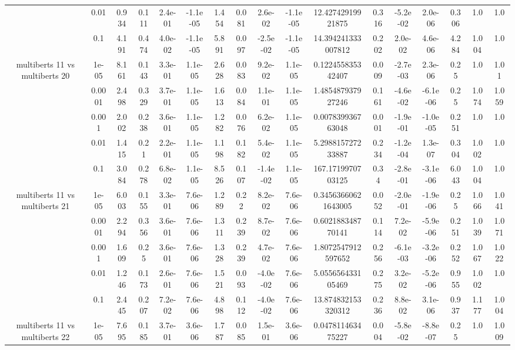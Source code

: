 \begin{tabular}{|c|c|c|c|c|c|c|c|c|c|c|c|c|c|c|c|c|}
 & 0.01 & 0.934 & 0.111 & 2.4e-01 & -1.1e-05 & 1.454 & 0.081 & 2.6e-02 & -1.1e-05 & 12.42742919921875 & 0.316 & -5.2e-02 & 2.0e-06 & 0.306 & 1.0 & 1.0 \\
 & 0.1 & 4.191 & 0.474 & 4.0e-02 & -1.1e-05 & 5.891 & 0.097 & -2.5e-02 & -1.1e-05 & 14.394241333007812 & 0.202 & 2.0e-02 & 4.6e-06 & 4.284 & 1.004 & 1.0 \\
\hline
\multirow{5}{*}{multiberts 11 vs multiberts 20} & 1e-05 & 8.161 & 0.143 & 3.3e-01 & 1.1e-05 & 2.628 & 0.083 & 9.2e-02 & 1.1e-05 & 0.122455835342407 & 0.009 & -2.7e-03 & 2.3e-06 & 0.25 & 1.0 & 1.01 \\
 & 0.0001 & 2.498 & 0.329 & 3.7e-01 & 1.1e-05 & 1.613 & 0.084 & 1.1e-01 & 1.1e-05 & 1.485487937927246 & 0.161 & -4.6e-02 & -6.1e-06 & 0.25 & 1.074 & 1.059 \\
 & 0.001 & 2.002 & 0.238 & 3.6e-01 & 1.1e-05 & 1.282 & 0.076 & 6.2e-02 & 1.1e-05 & 0.007839936763048 & 0.001 & -1.9e-01 & -1.0e-05 & 0.251 & 1.0 & 1.0 \\
 & 0.01 & 1.415 & 0.21 & 2.2e-01 & 1.1e-05 & 1.198 & 0.182 & 5.4e-02 & 1.1e-05 & 5.298815727233887 & 0.234 & -1.2e-04 & 1.3e-07 & 0.304 & 1.002 & 1.0 \\
 & 0.1 & 3.084 & 0.278 & 6.8e-02 & 1.1e-05 & 8.526 & 0.107 & -1.4e-02 & 1.1e-05 & 167.1719970703125 & 0.34 & -2.8e-01 & -3.1e-06 & 6.043 & 1.004 & 1.0 \\
\hline
\multirow{5}{*}{multiberts 11 vs multiberts 21} & 1e-05 & 6.003 & 0.155 & 3.3e-01 & 7.6e-06 & 1.289 & 0.22 & 8.2e-02 & 7.6e-06 & 0.34563660621643005 & 0.052 & -2.0e-01 & -1.9e-06 & 0.25 & 1.066 & 1.041 \\
 & 0.0001 & 2.294 & 0.356 & 3.6e-01 & 7.6e-06 & 1.311 & 0.239 & 8.7e-02 & 7.6e-06 & 0.602188348770141 & 0.114 & 7.2e-02 & -5.9e-06 & 0.251 & 1.039 & 1.071 \\
 & 0.001 & 1.609 & 0.25 & 3.6e-01 & 7.6e-06 & 1.328 & 0.239 & 4.7e-02 & 7.6e-06 & 1.8072547912597652 & 0.256 & -6.1e-03 & -3.2e-06 & 0.252 & 1.067 & 1.022 \\
 & 0.01 & 1.246 & 0.173 & 2.6e-01 & 7.6e-06 & 1.521 & 0.093 & -4.0e-02 & 7.6e-06 & 5.055656433105469 & 0.275 & 3.2e-02 & -5.2e-06 & 0.955 & 1.002 & 1.0 \\
 & 0.1 & 2.445 & 0.207 & 7.2e-02 & 7.6e-06 & 4.898 & 0.112 & -4.0e-02 & 7.6e-06 & 13.874832153320312 & 0.236 & 8.8e-02 & 3.1e-06 & 0.937 & 1.177 & 1.004 \\
\hline
\multirow{5}{*}{multiberts 11 vs multiberts 22} & 1e-05 & 7.695 & 0.185 & 3.7e-01 & 3.6e-06 & 1.787 & 0.085 & 1.5e-01 & 3.6e-06 & 0.047811463475227 & 0.004 & -5.8e-02 & -8.8e-07 & 0.25 & 1.0 & 1.009 \\

\end{tabular}
